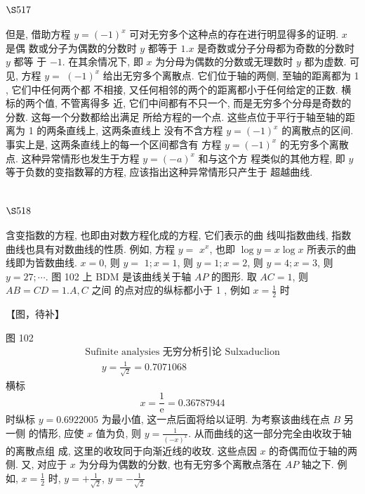 \section{$\S 517$}

但是, 借助方程 $y=(-1)^{x}$ 可对无穷多个这种点的存在进行明显得多的证明. $x$ 是偶 数或分子为偶数的分数时 $y$ 都等于 $1 . x$ 是奇数或分子分母都为奇数的分数时 $y$ 都等 于 $-1$. 在其余情况下, 即 $x$ 为分母为偶数的分数或无理数时 $y$ 都为虚数. 可见, 方程 $y=$ $(-1)^{x}$ 给出无穷多个离散点. 它们位于轴的两侧, 至轴的距离都为 1 , 它们中任何两个都 不相接, 又任何相邻的两个的距离都小于任何给定的正数. 横标的两个值, 不管离得多 近, 它们中间都有不只一个, 而是无穷多个分母是奇数的分数. 这每一个分数都给出满足 所给方程的一个点. 这些点位于平行于轴至轴的距离为 1 的两条直线上, 这两条直线上 没有不含方程 $y=(-1)^{x}$ 的离散点的区间. 事实上是, 这两条直线上的每一个区间都含有 方程 $y=(-1)^{x}$ 的无穷多个离散点. 这种异常情形也发生于方程 $y=(-a)^{x}$ 和与这个方 程类似的其他方程, 即 $y$ 等于负数的变指数幂的方程, 应该指出这种异常情形只产生于 超越曲线.

\section{$\S 518$}

含变指数的方程, 也即由对数方程化成的方程, 它们表示的曲 线叫指数曲线, 指数曲线也具有对数曲线的性质. 例如, 方程 $y=$ $x^{x}$, 也即 $\log y=x \log x$ 所表示的曲线即为皆数曲线. $x=0$, 则 $y=$ $1 ; x=1$, 则 $y=1 ; x=2$, 则 $y=4 ; x=3$, 则 $y=27 ; \cdots$. 图 102 上 BDM 是该曲线关于轴 $A P$ 的图形. 取 $A C=1$, 则 $A B=C D=1 . A, C$ 之间 的点对应的纵标都小于 1 , 例如 $x=\frac{1}{2}$ 时


【图，待补】

图 102 
\[
\begin{gathered}
\text { Sufinite analysies 无穷分析引论 Sulxaduclion } \\
\qquad y=\frac{1}{\sqrt{2}}=0.7071068
\end{gathered}
\]
横标
\[
x=\frac{1}{\mathrm{e}}=0.36787944
\]
时纵标 $y=0.6922005$ 为最小值, 这一点后面将给以证明. 为考察该曲线在点 $B$ 另一侧 的情形, 应使 $x$ 值为负, 则 $y=\frac{1}{(-x)^{x}}$. 从而曲线的这一部分完全由收玫于轴的离散点组 成, 这里的收玫同于向渐近线的收玫. 这些点因 $x$ 的奇偶而位于轴的两侧. 又, 对应于 $x$ 为分母为偶数的分数, 也有无穷多个离散点落在 $A P$ 轴之下. 例如, $x=\frac{1}{2}$ 时, $y=+\frac{1}{\sqrt{2}}$, $y=-\frac{1}{\sqrt{2}}$

